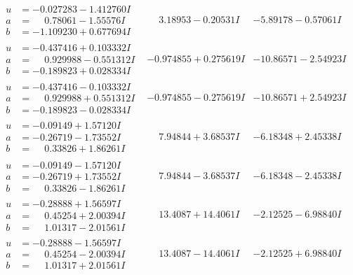 \documentclass[1p]{elsarticle_modified}
\theoremstyle{definition}
\begin{document}
$$\begin{array}{c|c|c}
\begin{aligned}
u &= -0.027283 - 1.412760 I \\
a &= \phantom{-}0.78061 - 1.55576 I \\
b &= -1.109230 + 0.677694 I\end{aligned}
 & \phantom{-}3.18953 - 0.20531 I & -5.89178 - 0.57061 I \\ \hline\begin{aligned}
u &= -0.437416 + 0.103332 I \\
a &= \phantom{-}0.929988 - 0.551312 I \\
b &= -0.189823 + 0.028334 I\end{aligned}
 & -0.974855 + 0.275619 I & -10.86571 - 2.54923 I \\ \hline\begin{aligned}
u &= -0.437416 - 0.103332 I \\
a &= \phantom{-}0.929988 + 0.551312 I \\
b &= -0.189823 - 0.028334 I\end{aligned}
 & -0.974855 - 0.275619 I & -10.86571 + 2.54923 I \\ \hline\begin{aligned}
u &= -0.09149 + 1.57120 I \\
a &= -0.26719 - 1.73552 I \\
b &= \phantom{-}0.33826 + 1.86261 I\end{aligned}
 & \phantom{-}7.94844 + 3.68537 I & -6.18348 + 2.45338 I \\ \hline\begin{aligned}
u &= -0.09149 - 1.57120 I \\
a &= -0.26719 + 1.73552 I \\
b &= \phantom{-}0.33826 - 1.86261 I\end{aligned}
 & \phantom{-}7.94844 - 3.68537 I & -6.18348 - 2.45338 I \\ \hline\begin{aligned}
u &= -0.28888 + 1.56597 I \\
a &= \phantom{-}0.45254 + 2.00394 I \\
b &= \phantom{-}1.01317 - 2.01561 I\end{aligned}
 & \phantom{-}13.4087 + 14.4061 I & -2.12525 - 6.98840 I \\ \hline\begin{aligned}
u &= -0.28888 - 1.56597 I \\
a &= \phantom{-}0.45254 - 2.00394 I \\
b &= \phantom{-}1.01317 + 2.01561 I\end{aligned}
 & \phantom{-}13.4087 - 14.4061 I & -2.12525 + 6.98840 I \\ \hline\begin{aligned}

\end{aligned}
\end{array}$$
\end{document}
